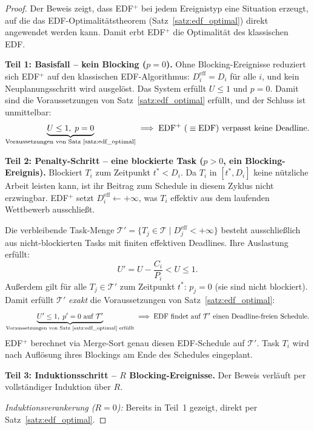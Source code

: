 ﻿\documentclass[a4paper,12pt]{article}
\theoremstyle{definition}
\begin{document}
	\begin{proof}
		Der Beweis zeigt, dass EDF$^+$ bei jedem Ereignistyp eine Situation erzeugt,
		auf die das EDF-Optimalitätstheorem (Satz~\ref{satz:edf_optimal}) direkt
		angewendet werden kann. Damit erbt EDF$^+$ die Optimalität des
		klassischen EDF.

		\medskip
		\textbf{Teil 1: Basisfall -- kein Blocking ($p = 0$).}
		Ohne Blocking-Ereignisse reduziert sich EDF$^+$ auf den klassischen
		EDF-Algorithmus: $D_i^{\text{eff}} = D_i$ für alle $i$,
		und kein Neuplanungsschritt wird ausgelöst. Das System erfüllt
		$U \le 1$ und $p = 0$. Damit sind die Voraussetzungen von
		Satz~\ref{satz:edf_optimal} erfüllt, und der Schluss ist unmittelbar:
		\[
		\underbrace{U \le 1,\; p = 0}_{\text{Voraussetzungen von Satz~\ref{satz:edf_optimal}}}
		\;\Longrightarrow\;
		\text{EDF$^+$ (}\equiv \text{EDF) verpasst keine Deadline.}
		\]

		\medskip
		\textbf{Teil 2: Penalty-Schritt -- eine blockierte Task ($p > 0$,
		ein Blocking-Ereignis).}
		Blockiert $T_i$ zum Zeitpunkt $t^* < D_i$.
		Da $T_i$ in $[t^*, D_i]$ keine nützliche Arbeit leisten kann,
		ist ihr Beitrag zum Schedule in diesem Zyklus nicht erzwingbar.
		EDF$^+$ setzt $D_i^{\text{eff}} \leftarrow +\infty$, was $T_i$
		effektiv aus dem laufenden Wettbewerb ausschlie\ss{}t.

		Die verbleibende Task-Menge
		$\mathcal{T}' = \{T_j \in \mathcal{T} \mid D_j^{\text{eff}} < +\infty\}$
		besteht ausschlie\ss{}lich aus nicht-blockierten Tasks mit finiten
		effektiven Deadlines. Ihre Auslastung erfüllt:
		\[
		U' = U - \frac{C_i}{P_i} < U \le 1.
		\]
		Au\ss{}erdem gilt für alle $T_j \in \mathcal{T}'$ zum Zeitpunkt $t^*$:
		$p_j = 0$ (sie sind nicht blockiert).
		Damit erfüllt $\mathcal{T}'$ \emph{exakt} die Voraussetzungen von
		Satz~\ref{satz:edf_optimal}:
		\[
		\underbrace{U' \le 1,\; p' = 0 \text{ auf } \mathcal{T}'}_{%
		\text{Voraussetzungen von Satz~\ref{satz:edf_optimal} erfüllt}}
		\;\Longrightarrow\;
		\text{EDF findet auf } \mathcal{T}' \text{ einen Deadline-freien Schedule.}
		\]
		EDF$^+$ berechnet via Merge-Sort genau diesen EDF-Schedule auf $\mathcal{T}'$.
		Task $T_i$ wird nach Auflösung ihres Blockings am Ende des Schedules
		eingeplant.

		\medskip
		\textbf{Teil 3: Induktionsschritt -- $R$ Blocking-Ereignisse.}
		Der Beweis verläuft per vollständiger Induktion über $R$.

		\emph{Induktionsverankerung ($R = 0$):} Bereits in Teil~1 gezeigt,
		direkt per Satz~\ref{satz:edf_optimal}.


\end{proof}
\end{document}
